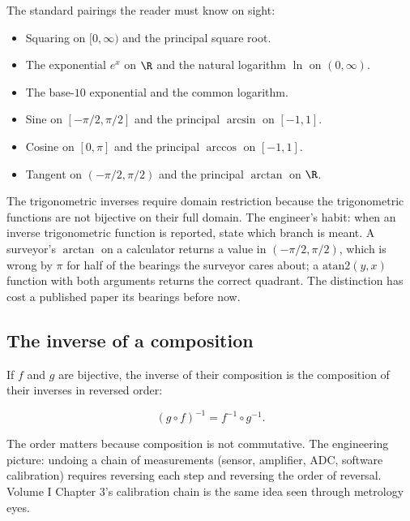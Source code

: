The standard pairings the reader must know on sight:

\begin{itemize}[leftmargin=*]
  \item Squaring on $[0, \infty)$ and the principal square root.
  \item The exponential $e^{x}$ on $\R$ and the natural logarithm
    $\ln$ on $(0, \infty)$.
  \item The base-$10$ exponential and the common logarithm.
  \item Sine on $[-\pi/2, \pi/2]$ and the principal $\arcsin$ on
    $[-1, 1]$.
  \item Cosine on $[0, \pi]$ and the principal $\arccos$ on $[-1, 1]$.
  \item Tangent on $(-\pi/2, \pi/2)$ and the principal $\arctan$ on
    $\R$.
\end{itemize}

The trigonometric inverses require domain restriction because the
trigonometric functions are not bijective on their full domain. The
engineer's habit: when an inverse trigonometric function is reported,
state which branch is meant. A surveyor's $\arctan$ on a calculator
returns a value in $(-\pi/2, \pi/2)$, which is wrong by $\pi$ for
half of the bearings the surveyor cares about; a $\mathrm{atan2}(y,
x)$ function with both arguments returns the correct quadrant. The
distinction has cost a published paper its bearings before now.

\subsection{The inverse of a composition}

If $f$ and $g$ are bijective, the inverse of their composition is the
composition of their inverses in reversed order:

\[
(g \circ f)^{-1} = f^{-1} \circ g^{-1}.
\]

The order matters because composition is not commutative. The
engineering picture: undoing a chain of measurements (sensor,
amplifier, ADC, software calibration) requires reversing each step
and reversing the order of reversal. Volume I Chapter 3's calibration
chain is the same idea seen through metrology eyes.

